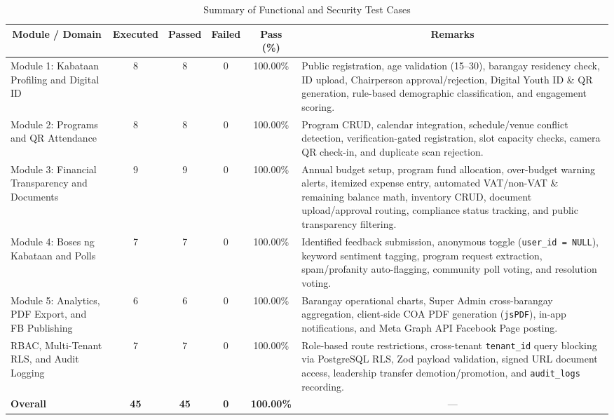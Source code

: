 \begin{table}[H]
\centering
\footnotesize
\setlength{\tabcolsep}{4pt}
\caption{Summary of Functional and Security Test Cases}
\label{tab:summary_functional_and_security_test_cases}
\begin{tabular}{|p{2.9cm}|c|c|c|c|p{5.5cm}|}
\hline
\multicolumn{1}{|c|}{\textbf{Module / Domain}} & \textbf{Executed} & \textbf{Passed} & \textbf{Failed} & \textbf{Pass (\%)} & \multicolumn{1}{c|}{\textbf{Remarks}} \\ \hline
Module 1: Kabataan Profiling and Digital ID & 8 & 8 & 0 & 100.00\% & Public registration, age validation (15--30), barangay residency check, ID upload, Chairperson approval/rejection, Digital Youth ID \& QR generation, rule-based demographic classification, and engagement scoring. \\ \hline
Module 2: Programs and QR Attendance & 8 & 8 & 0 & 100.00\% & Program CRUD, calendar integration, schedule/venue conflict detection, verification-gated registration, slot capacity checks, camera QR check-in, and duplicate scan rejection. \\ \hline
Module 3: Financial Transparency and Documents & 9 & 9 & 0 & 100.00\% & Annual budget setup, program fund allocation, over-budget warning alerts, itemized expense entry, automated VAT/non-VAT \& remaining balance math, inventory CRUD, document upload/approval routing, compliance status tracking, and public transparency filtering. \\ \hline
Module 4: Boses ng Kabataan and Polls & 7 & 7 & 0 & 100.00\% & Identified feedback submission, anonymous toggle (\texttt{user\_id = NULL}), keyword sentiment tagging, program request extraction, spam/profanity auto-flagging, community poll voting, and resolution voting. \\ \hline
Module 5: Analytics, PDF Export, and FB Publishing & 6 & 6 & 0 & 100.00\% & Barangay operational charts, Super Admin cross-barangay aggregation, client-side COA PDF generation (\texttt{jsPDF}), in-app notifications, and Meta Graph API Facebook Page posting. \\ \hline
RBAC, Multi-Tenant RLS, and Audit Logging & 7 & 7 & 0 & 100.00\% & Role-based route restrictions, cross-tenant \texttt{tenant\_id} query blocking via PostgreSQL RLS, Zod payload validation, signed URL document access, leadership transfer demotion/promotion, and \texttt{audit\_logs} recording. \\ \hline
\textbf{Overall} & \textbf{45} & \textbf{45} & \textbf{0} & \textbf{100.00\%} & \multicolumn{1}{c|}{---} \\ \hline
\end{tabular}
\end{table}
\vspace{5mm}

